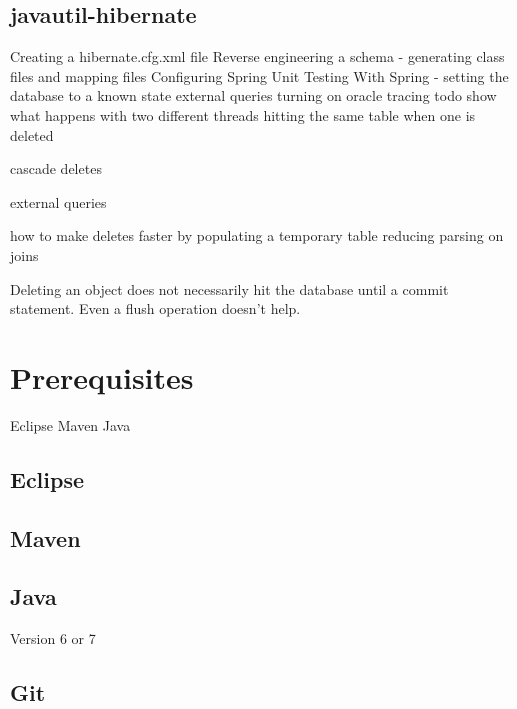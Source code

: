 \documentclass[a4paper,10pt]{book}
\begin{document}
\section{javautil-hibernate}
Creating a hibernate.cfg.xml file
Reverse engineering a schema - generating class files and mapping files
Configuring Spring
Unit Testing With Spring - setting the database to a known state
external queries
turning on oracle tracing 
todo show what happens with two different threads hitting the same table when one is deleted

cascade deletes

external queries

how to make deletes faster by populating a temporary table
reducing parsing on joins

Deleting an object does not necessarily hit the database until a commit statement.  Even a flush operation doesn't help.

\chapter{Prerequisites}
Eclipse
Maven
Java
\section{Eclipse}
\section{Maven}
\section{Java}
Version 6 or 7
\section{Git}
\end{document}
